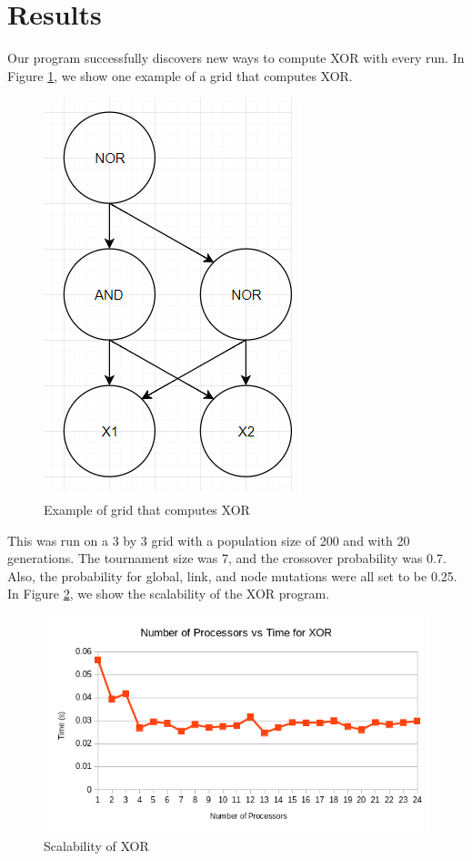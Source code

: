 \documentclass{article}
\begin{document}
	\section{Results}
	Our program successfully discovers new ways to compute XOR with every run. In Figure \ref{xorex}, we show one example of a grid that computes XOR.
		\begin{figure}
		\centering
		\includegraphics[scale=1]{xor.png}
		\caption{Example of grid that computes XOR}
		\label{xorex}
	\end{figure}
	 This was run on a 3 by 3 grid with a population size of 200 and with 20 generations. The tournament size was 7, and the crossover probability was 0.7. Also, the probability for global, link, and node mutations were all set to be 0.25.  In Figure \ref{xor_scalability}, we show the scalability of the XOR program.

	\begin{figure}
		\centering
		\includegraphics[width=\textwidth]{xor_scalability.png}
		\caption{Scalability of XOR}
		\label{xor_scalability}
	\end{figure}
\end{document}

